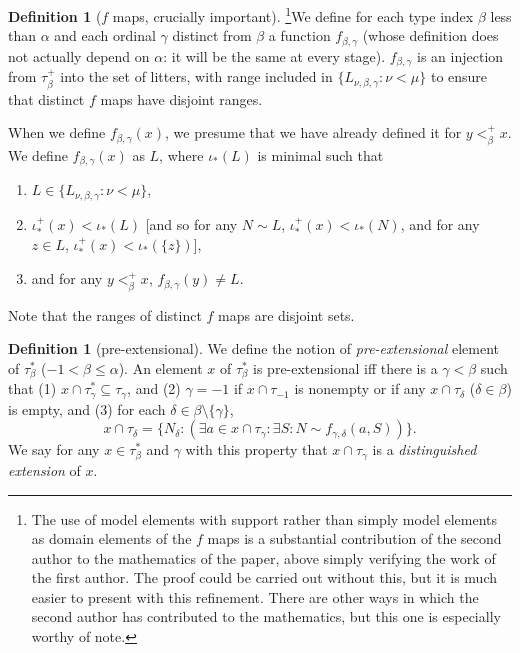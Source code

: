 \documentclass[112pt]{article}
\theoremstyle{definition}
\newtheorem{definition}[theorem]{Definition}
\theoremstyle{remark}
\begin{document}
\begin{definition}[$f$ maps, crucially important]\footnote{The use of model elements with support rather than simply model elements as domain elements of the $f$ maps is a substantial contribution of the second author to the mathematics of the paper, above simply verifying the work of the first author.  The proof could be carried out without this, but it is much easier to present with this refinement.  There are other ways in which the second author has contributed to the mathematics, but this one is especially worthy of note.}\label{def:f_map}
We define for each type index $\beta$ less than $\alpha$ and each ordinal $\gamma$ distinct from $\beta$ a function $f_{\beta,\gamma}$ (whose definition does not actually depend on $\alpha$:  it will be the same at every stage).  $f_{\beta,\gamma}$ is an injection from $\tau_\beta^+$ into the set of litters, with range included in  $\{L_{\nu,\beta,\gamma}:\nu < \mu\}$ to ensure that distinct $f$ maps have disjoint ranges.




When we define $f_{\beta,\gamma}(x)$, we presume that we have already defined it for $y <^+_\beta x$.
We define $f_{\beta,\gamma}(x)$ as $L$, where $\iota_*(L)$ is minimal such that

\begin{enumerate}
\item $L \in  \{L_{\nu,\beta,\gamma}:\nu < \mu\}$,

\item  $\iota^+_*(x) <\iota_*(L)$ [and so for any $N \sim L$, $\iota^+_*(x) <\iota_*(N)$, and for any $z \in L$, $\iota^+_*(x) < \iota_*(\{z\})$],

\item and for any $y<_\beta^+ x$, $f_{\beta,\gamma}(y) \neq L$.

\end{enumerate}

\end{definition}

Note that the ranges of distinct $f$ maps are disjoint sets.

\begin{definition}[pre-extensional]\label{def:pre_extensional}
We define the notion of {\em pre-extensional\/} element of $\tau^*_\beta$ ($-1 <\beta \leq \alpha$).   An element $x$ of $\tau^*_\beta$ is pre-extensional iff there is a $\gamma<\beta$ such that (1) $x \cap \tau^*_\gamma \subseteq \tau_\gamma$, and (2) $\gamma=-1$ if
$x \cap \tau_{-1}$ is nonempty or if any $x \cap \tau_\delta$ ($\delta \in \beta$) is empty,  and (3) for each $\delta \in \beta \setminus \{\gamma\}$, $$x \cap \tau_\delta= \{N_\delta:(\exists a \in x\cap \tau_\gamma:\exists S:N \sim f_{\gamma,\delta}(a,S))\}.$$  We say for any $x \in \tau^*_\beta$ and $\gamma$ with this property that $x \cap \tau_\gamma$ is a {\em distinguished extension\/} of $x$.
\end{definition}
\end{document}
